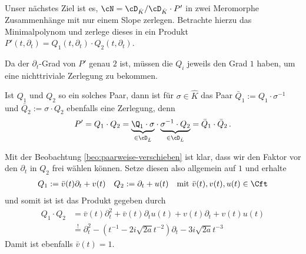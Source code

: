 Unser nächstes Ziel ist es, $\cN=\cD_{\hat K}/\cD_{\hat K}\cdot P'$ in zwei
Meromorphe Zusammenhänge mit nur einem Slope zerlegen.  Betrachte hierzu das
Minimalpolynom und zerlege dieses in ein Produkt
$P'(t,\partial_t)=Q_1(t,\partial_t)\cdot Q_2(t,\partial_t)$.

Da der $\partial_t$-Grad von $P'$ genau $2$ ist, müssen die $Q_i$
jeweils den Grad $1$ haben, um eine nichttriviale Zerlegung zu bekommen.
\begin{beo} \label{beo:paarweise-verschieben}
Ist $Q_1$ und $Q_2$ so ein solches Paar, dann ist für $\sigma\in \hat K$ das
Paar $\bar Q_1:=Q_1\cdot \sigma^{-1}$ und $\bar Q_2:=\sigma\cdot Q_2$ ebenfalls
eine Zerlegung, denn
\[
P'=Q_1\cdot Q_2=
\underset{\in\cD_{\hat L}}{\underbrace{
  \Q_1\cdot\sigma
}}
\cdot
\underset{\in\cD_{\hat L}}{\underbrace{
  \sigma^{-1}\cdot Q_2
}}
=\bar Q_1 \cdot \bar Q_2 \,.
\]
\end{beo}
Mit der Beobachtung \ref{beo:paarweise-verschieben} ist klar, dass wir
den Faktor vor den $\partial_t$ in $Q_2$ frei wählen können. Setze diesen
also allgemein auf $1$ und erhalte
\begin{align*}
Q_1&:=\bar v(t) \partial_t + v(t) & Q_2&:=\partial_t + u(t)
& \mbox{mit } \bar v(t), v(t), u(t)\in \Cft
\end{align*}
und somit ist ist das Produkt gegeben durch
\begin{equation} \label{eq:schritt100}
  \begin{aligned}
Q_1\cdot Q_2&=\bar v(t) \partial_t^2 + \bar v(t)\partial_t u(t) +
  v(t)\partial_t + v(t)u(t)
\\&\overset{!}{=} \partial_t^2 - (t^{-1} - 2i\sqrt{2a}t^{-2})\partial_t
  - 3 i\sqrt{2a}t^{-3}
  \end{aligned}
\end{equation}
Damit ist ebenfalls $\bar v(t)=1$.


